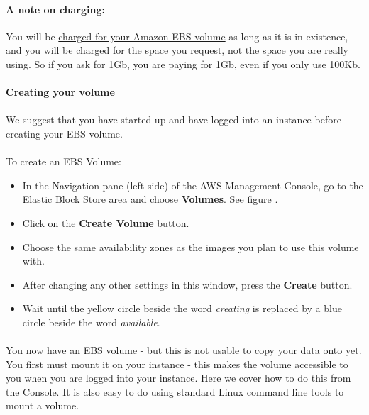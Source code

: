 \paragraph{A note on charging:}You will be \href{http://aws.amazon.com/ec2/}{charged for your Amazon EBS volume} as long as it is in existence, and you will be charged for the space you request, not the space you are really using. So if you ask for 1Gb, you are paying for 1Gb, even if you only use 100Kb. 

\paragraph{Creating your volume}

\paragraph{}We suggest that you have started up and have logged into an instance before creating your EBS volume. 
\paragraph{}To create an EBS Volume:
\begin{itemize}
\item In the Navigation pane (left side) of the AWS Management Console, go to the Elastic Block Store area and choose \textbf{Volumes}. See figure \href{fig:volumecreate}.
\item Click on the \textbf{Create Volume} button.
\item Choose the same availability zones as the images you plan to use this volume with.
\item After changing any other settings in this window, press the \textbf{Create} button.
\item Wait until the yellow circle beside the word \emph{creating} is replaced by a blue circle beside the word \emph{available}.
\end{itemize}

\paragraph{}You now have an EBS volume - but this is not usable to copy your data onto yet. You first must mount it on your instance - this makes the volume accessible to you when you are logged into your instance. Here we cover how to do this from the Console. It is also easy to do using standard Linux command line tools to mount a volume.

